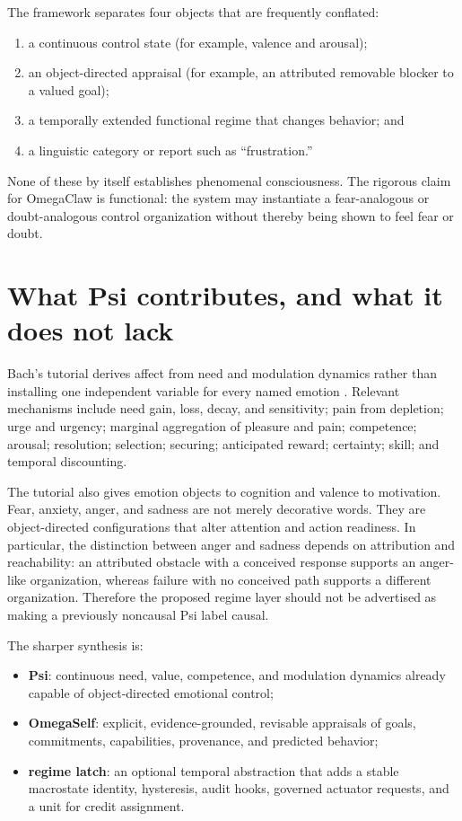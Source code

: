 \documentclass[11pt]{article}
\begin{document}
The framework separates four objects that are frequently conflated:
\begin{enumerate}[leftmargin=*]
  \item a continuous control state (for example, valence and arousal);
  \item an object-directed appraisal (for example, an attributed removable
  blocker to a valued goal);
  \item a temporally extended functional regime that changes behavior; and
  \item a linguistic category or report such as ``frustration.''
\end{enumerate}
None of these by itself establishes phenomenal consciousness.  The rigorous
claim for OmegaClaw is functional: the system may instantiate a fear-analogous
or doubt-analogous control organization without thereby being shown to feel fear
or doubt.

\section{What Psi contributes, and what it does not lack}

Bach's tutorial derives affect from need and modulation dynamics rather than
installing one independent variable for every named emotion
\cite{bach2018}.  Relevant mechanisms include need gain, loss, decay, and
sensitivity; pain from depletion; urge and urgency; marginal aggregation of
pleasure and pain; competence; arousal; resolution; selection; securing;
anticipated reward; certainty; skill; and temporal discounting.

The tutorial also gives emotion objects to cognition and valence to motivation.
Fear, anxiety, anger, and sadness are not merely decorative words.  They are
object-directed configurations that alter attention and action readiness.  In
particular, the distinction between anger and sadness depends on attribution and
reachability: an attributed obstacle with a conceived response supports an
anger-like organization, whereas failure with no conceived path supports a
different organization.  Therefore the proposed regime layer should not be
advertised as making a previously noncausal Psi label causal.

The sharper synthesis is:
\begin{itemize}[leftmargin=*]
  \item \textbf{Psi}: continuous need, value, competence, and modulation
  dynamics already capable of object-directed emotional control;
  \item \textbf{OmegaSelf}: explicit, evidence-grounded, revisable appraisals of
  goals, commitments, capabilities, provenance, and predicted behavior;
  \item \textbf{regime latch}: an optional temporal abstraction that adds a
  stable macrostate identity, hysteresis, audit hooks, governed actuator
  requests, and a unit for credit assignment.
\end{itemize}
\end{document}
